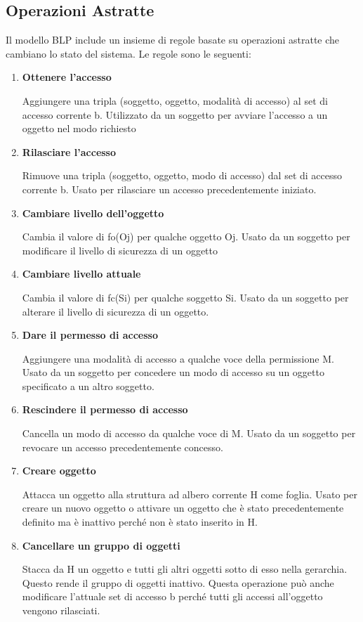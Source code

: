 \newpage
\subsection{Operazioni Astratte}
Il modello BLP include un insieme di regole basate su operazioni astratte che cambiano lo stato del sistema. Le regole sono le seguenti:

\begin{enumerate}
    \item \textbf{Ottenere l'accesso}
    
    Aggiungere una tripla (soggetto, oggetto, modalità di accesso) al set di accesso corrente b. Utilizzato da un soggetto per avviare l'accesso a un oggetto nel modo richiesto

    \item \textbf{Rilasciare l'accesso}
    
    Rimuove una tripla (soggetto, oggetto, modo di accesso) dal set di accesso corrente b. Usato per rilasciare un accesso precedentemente iniziato.
    
    \item \textbf{Cambiare livello dell'oggetto}
    
    Cambia il valore di fo(Oj) per qualche oggetto Oj. Usato da un soggetto per modificare il livello di sicurezza di un oggetto
    
    \item \textbf{Cambiare livello attuale}
    
    Cambia il valore di fc(Si) per qualche soggetto Si. Usato da un soggetto per alterare il livello di sicurezza di un oggetto.
    
    \item \textbf{Dare il permesso di accesso}
    
    Aggiungere una modalità di accesso a qualche voce della permissione M. Usato da un soggetto per concedere un modo di accesso su un oggetto specificato a un altro soggetto.
    
    \item \textbf{Rescindere il permesso di accesso}
    
    Cancella un modo di accesso da qualche voce di M. Usato da un soggetto per revocare un accesso precedentemente concesso.
    
    \item \textbf{Creare oggetto}
    
    Attacca un oggetto alla struttura ad albero corrente H come foglia. Usato per creare un nuovo oggetto o attivare un oggetto che è stato precedentemente definito ma è inattivo perché non è stato inserito in H.
    
    \item \textbf{Cancellare un gruppo di oggetti}
    
    Stacca da H un oggetto e tutti gli altri oggetti sotto di esso nella gerarchia. Questo rende il gruppo di oggetti inattivo. Questa operazione può anche modificare l'attuale set di accesso b perché tutti gli accessi all'oggetto vengono rilasciati.
\end{enumerate}

